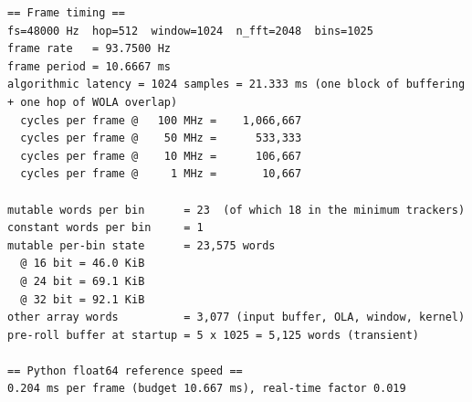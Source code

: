 \begin{lstlisting}[style=plain]
== Frame timing ==
fs=48000 Hz  hop=512  window=1024  n_fft=2048  bins=1025
frame rate   = 93.7500 Hz
frame period = 10.6667 ms
algorithmic latency = 1024 samples = 21.333 ms (one block of buffering + one hop of WOLA overlap)
  cycles per frame @   100 MHz =    1,066,667
  cycles per frame @    50 MHz =      533,333
  cycles per frame @    10 MHz =      106,667
  cycles per frame @     1 MHz =       10,667

mutable words per bin      = 23  (of which 18 in the minimum trackers)
constant words per bin     = 1
mutable per-bin state      = 23,575 words
  @ 16 bit = 46.0 KiB
  @ 24 bit = 69.1 KiB
  @ 32 bit = 92.1 KiB
other array words          = 3,077 (input buffer, OLA, window, kernel)
pre-roll buffer at startup = 5 x 1025 = 5,125 words (transient)

== Python float64 reference speed ==
0.204 ms per frame (budget 10.667 ms), real-time factor 0.019
\end{lstlisting}
